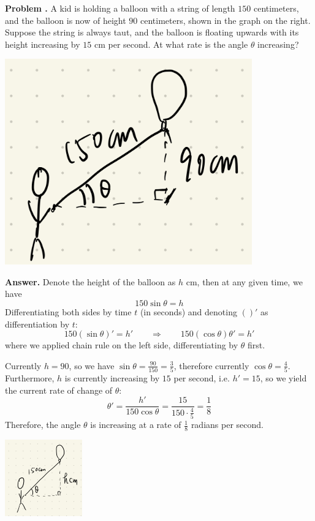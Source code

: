 \documentclass[11pt,letterpaper]{article}
\newcounter{problem}
\newcommand{\problem}{
	\stepcounter{problem}%
	\noindent \textbf{Problem \theproblem. }%
}
\newcommand{\answer}{\noindent \textbf{Answer. }}
\begin{document}
\noindent\begin{minipage}{0.7\textwidth}
    \problem A kid is holding a balloon with a string of length $150$ centimeters, and the balloon is now of height $90$ centimeters, shown in the graph on the right. Suppose the string is always taut, and the balloon is floating upwards with its height increasing by $15$ cm per second.  At what rate is the angle $\theta$ increasing?
\end{minipage}
\begin{minipage}{0.3\textwidth}
    \begin{center}
        \includegraphics[width = 0.8\textwidth]{../graph/A11.png}
    \end{center}
\end{minipage}
\vspace{12mm}

\answer Denote the height of the balloon as $h$ cm, then at any given time, we have 
    \[150 \sin \theta = h\]
    Differentiating both sides by time $t$ (in seconds) and denoting $()'$ as differentiation by $t$:
    \[150 (\sin \theta)' = h' \qquad \Rightarrow \qquad 150 (\cos \theta) \theta' = h' \]
    where we applied chain rule on the left side, differentiating by $\theta$ first.  
    
    Currently $h = 90$, so we have $\sin \theta = \frac{90}{150} = \frac{3}{5}$, therefore currently $\cos \theta = \frac{4}{5}$.  Furthermore, $h$ is currently increasing by $15$ per second, i.e. $h' = 15$,  so we yield the current rate of change of $\theta$:
    \[\theta' = \frac{h'}{150 \cos \theta} = \frac{15}{150\cdot\frac{4}{5}} = \frac{1}{8}\]
    Therefore, the angle $\theta$ is increasing at a rate of $\frac{1}{8}$ radians per second.
\begin{center}
    \includegraphics[width = 0.25\textwidth]{../graph/A11_Sol_1.png}
\end{center}\vspace{6mm}
\end{document}
